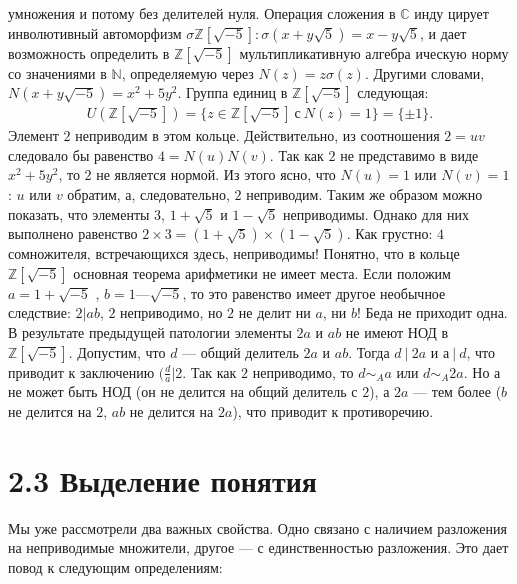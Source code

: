 \documentclass{../../template/mai_book}
\begin{document}
\newpage
\setcounter{page}{188}
\noindent умножения и потому без делителей нуля. Операция сложения в $\mathds{C}$ инду­
цирует инволютивный автоморфизм $\sigma \mathds{Z}[\sqrt{-5}]:\sigma(x+y\sqrt{5}) = x - y\sqrt{5}$,
и дает возможность определить в $\mathds{Z}[\sqrt{-5}]$ мультипликативную алгебра­
ическую норму со значениями в $\mathds{N}$, определяемую через $N(z) = z\sigma(z)$.
Другими словами, $N(x + y\sqrt{-5}) = x^2 + 5y^2$. Группа единиц в $\mathds{Z}[\sqrt{-5}]$ следующая:
\begin{align*}
U(\mathds{Z}[\sqrt{-5}]) =  \{z \in \mathds{Z}[\sqrt{-5}]\:\text{с}\:N(z) = 1\} = \{\pm 1\}\text{.}
\end{align*}
\indent Элемент $2$ неприводим в этом кольце. Действительно, из соотношения $2 = uv$ следовало бы равенство $4 = N(u)N(v)$. Так как $2$ не представимо в виде $x^2 + 5y^2$, то $2$ не является нормой. Из этого ясно, что $N(u) = 1$ или $N(v) = 1$: $u$ или $v$ обратим, а, следовательно, $2$ неприводим. Таким же образом можно показать, что элементы $3$, $1 + \sqrt{5}$ и $1 - \sqrt{5}$ неприводимы. Однако для них выполнено равенство $2 \times 3 = (1 + \sqrt{5} )\times(1 - \sqrt{5})$. Как грустно: $4$ сомножителя, встречающихся здесь, неприводимы! Понятно, что в кольце $\mathds{Z}[\sqrt{-5}]$ основная теорема арифметики не имеет места. \newline \indent Если положим $a = 1 + \sqrt{-5}$ , $b = 1 — \sqrt{-5}$, то это равенство имеет другое необычное следствие: $2 | ab$, $2$ неприводимо, но $2$ не делит ни $a$, ни $b$! Беда не приходит одна. В результате предыдущей патологии элементы $2a$ и $ab$ не имеют НОД в $\mathds{Z}[\sqrt{-5}]$. Допустим, что $d$ — общий делитель $2a$ и $ab$. Тогда $d\:|\:2a$ и $а\:|\:d$, что приводит к заключению $(\frac{d}{a} | 2$. Так как $2$ неприводимо, то $d \sim_A a $ или $d \sim_A 2a$. Но а не может быть НОД (он не делится на общий делитель с $2$), а $2a$ — тем более ($b$ не делится на $2$, $ab$ не делится на $2a$), что приводит к противоречию.

\section{\large 2.3 Выделение понятия}
\noindent Мы уже рассмотрели два важных свойства. Одно связано с наличием разложения на неприводимые множители, другое — с единственностью разложения. Это дает повод к следующим определениям:
\end{document}
